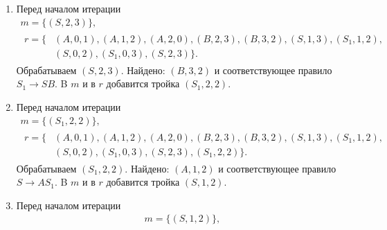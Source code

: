 \begin{example}
\begin{enumerate}
              \begin{gather*}
                  m = \{(S_1, 0, 3)\}, \\
                  \begin{aligned}
                      r = \{ & (A, 0, 1), (A, 1, 2), (A, 2, 0), (B, 2, 3), (B, 3, 2), (S, 1, 3), (S_1, 1, 2), \\
                             & (S, 0, 2), (S_1, 0, 3)\}.
                  \end{aligned}
              \end{gather*}
              Обрабатываем $(S_1, 0, 3)$.
              Найдено: $(A, 2, 0)$ и соответствующее правило $S \to A S_1$.
              B $m$ и в $r$ добавится тройка $(S, 2, 3)$.
        \item Перед началом итерации
              \begin{gather*}
                  m = \{(S, 2, 3)\}, \\
                  \begin{aligned}
                      r = \{ & (A, 0, 1), (A, 1, 2), (A, 2, 0), (B, 2, 3), (B, 3, 2), (S, 1, 3), (S_1, 1, 2), \\
                             & (S, 0, 2), (S_1, 0, 3), (S, 2, 3)\}.
                  \end{aligned}
              \end{gather*}
              Обрабатываем $(S, 2, 3)$.
              Найдено: $(B, 3, 2)$ и соответствующее правило $S_1 \to S B$.
              B $m$ и в $r$ добавится тройка $(S_1, 2, 2)$.
        \item Перед началом итерации
              \begin{gather*}
                  m = \{(S_1, 2, 2)\}, \\
                  \begin{aligned}
                      r = \{ & (A, 0, 1), (A, 1, 2), (A, 2, 0), (B, 2, 3), (B, 3, 2), (S, 1, 3), (S_1, 1, 2), \\
                             & (S, 0, 2), (S_1, 0, 3), (S, 2, 3), (S_1, 2, 2)\}.
                  \end{aligned}
              \end{gather*}
              Обрабатываем $(S_1, 2, 2)$.
              Найдено: $(A, 1, 2)$ и соответствующее правило $S \to A S_1$.
              B $m$ и в $r$ добавится тройка $(S, 1, 2)$.
        \item Перед началом итерации
              \begin{gather*}
                  m = \{(S, 1, 2)\}, \\

\end{gather*}
\end{enumerate}
\end{example}
